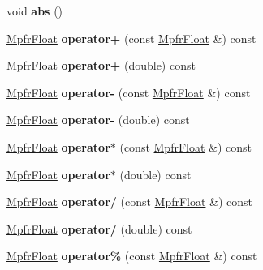 \begin{DoxyCompactItemize}
void {\bfseries abs} ()
\item 
\mbox{\label{class_mpfr_float_a63225dcc79a58f1e37ac3d4c63831a4e}} 
\hyperlink{class_mpfr_float}{Mpfr\+Float} {\bfseries operator+} (const \hyperlink{class_mpfr_float}{Mpfr\+Float} \&) const
\item 
\mbox{\label{class_mpfr_float_a29fe2d9be874b90ff407e4bbb00b4071}} 
\hyperlink{class_mpfr_float}{Mpfr\+Float} {\bfseries operator+} (double) const
\item 
\mbox{\label{class_mpfr_float_ab7e37245e6fbbebfb252f436f5060a3b}} 
\hyperlink{class_mpfr_float}{Mpfr\+Float} {\bfseries operator-\/} (const \hyperlink{class_mpfr_float}{Mpfr\+Float} \&) const
\item 
\mbox{\label{class_mpfr_float_a5346ad4c4038a0b071719b6a0e11f959}} 
\hyperlink{class_mpfr_float}{Mpfr\+Float} {\bfseries operator-\/} (double) const
\item 
\mbox{\label{class_mpfr_float_a9505359f5efd4126937488c1165eb1bd}} 
\hyperlink{class_mpfr_float}{Mpfr\+Float} {\bfseries operator$\ast$} (const \hyperlink{class_mpfr_float}{Mpfr\+Float} \&) const
\item 
\mbox{\label{class_mpfr_float_ad67ba7cd219616c35f025bf1f760ecc5}} 
\hyperlink{class_mpfr_float}{Mpfr\+Float} {\bfseries operator$\ast$} (double) const
\item 
\mbox{\label{class_mpfr_float_afe0671a46f3c25a0accc570537226995}} 
\hyperlink{class_mpfr_float}{Mpfr\+Float} {\bfseries operator/} (const \hyperlink{class_mpfr_float}{Mpfr\+Float} \&) const
\item 
\mbox{\label{class_mpfr_float_af2ee4339330678bbd62b231b786f4bb6}} 
\hyperlink{class_mpfr_float}{Mpfr\+Float} {\bfseries operator/} (double) const
\item 
\mbox{\label{class_mpfr_float_aa28677307c688c851415eba8781dfdb1}} 
\hyperlink{class_mpfr_float}{Mpfr\+Float} {\bfseries operator\%} (const \hyperlink{class_mpfr_float}{Mpfr\+Float} \&) const
\item 

\end{DoxyCompactItemize}
